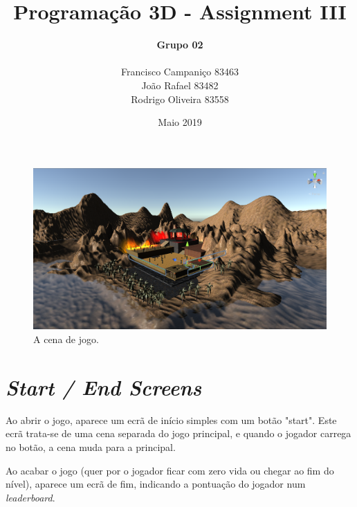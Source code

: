 \documentclass{article}
\title{
    \textbf{Programação 3D - Assignment III}
    }
\author{
    \begin{Large}
        \textbf{Grupo 02}
    \end{Large}\\
    Francisco Campaniço 83463\\
    João Rafael 83482\\
    Rodrigo Oliveira 83558
}
\date{Maio 2019}
\begin{document}
    \maketitle
    \begin{figure}[h]\begin{center}
        \includegraphics[scale=0.27]{Screenshot_1.png}
        \caption{A cena de jogo.}
    \end{center}\end{figure}

    \section*{\textit{Start / End Screens}}
        \par
        Ao abrir o jogo, aparece um ecrã de início simples com um botão "start". Este ecrã trata-se de uma cena separada do jogo principal, e quando o jogador carrega no botão, a cena muda para a principal.
        \par
        Ao acabar o jogo (quer por o jogador ficar com zero vida ou chegar ao fim do nível), aparece um ecrã de fim, indicando a pontuação do jogador num \textit{leaderboard}.
\end{document}
